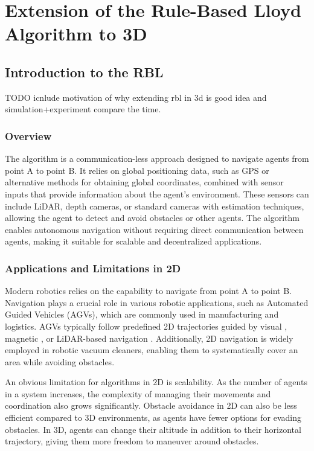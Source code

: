 \chapter{Extension of the Rule-Based Lloyd Algorithm to 3D\label{chap:rbl}}

\section{Introduction to the RBL}

    TODO icnlude motivation of why extending rbl in 3d is good idea and simulation+experiment compare the time.

    \subsection{Overview}
        The algorithm is a communication-less approach designed to navigate agents from point A to point B. 
        It relies on global positioning data, such as GPS or alternative methods for obtaining global coordinates, combined with sensor inputs that provide information about the agent's environment. 
        These sensors can include LiDAR, depth cameras, or standard cameras with estimation techniques, allowing the agent to detect and avoid obstacles or other agents. 
        The algorithm enables autonomous navigation without requiring direct communication between agents, making it suitable for scalable and decentralized applications.

    \subsection{Applications and Limitations in 2D}
        Modern robotics relies on the capability to navigate from point A to point B.
        Navigation plays a crucial role in various robotic applications, such as Automated Guided Vehicles (AGVs), which are commonly used in manufacturing and logistics. 
        AGVs typically follow predefined 2D trajectories guided by visual \cite{vision_navigation}, magnetic \cite{magnetic_navigation}, or LiDAR-based navigation \cite{lidar_navigation}. 
        Additionally, 2D navigation is widely employed in robotic vacuum cleaners, enabling them to systematically cover an area while avoiding obstacles.

        An obvious limitation for algorithms in 2D is scalability. 
        As the number of agents in a system increases, the complexity of managing their movements and coordination also grows significantly.
        Obstacle avoidance in 2D can also be less efficient compared to 3D environments, as agents have fewer options for evading obstacles. 
        In 3D, agents can change their altitude in addition to their horizontal trajectory, giving them more freedom to maneuver around obstacles.

